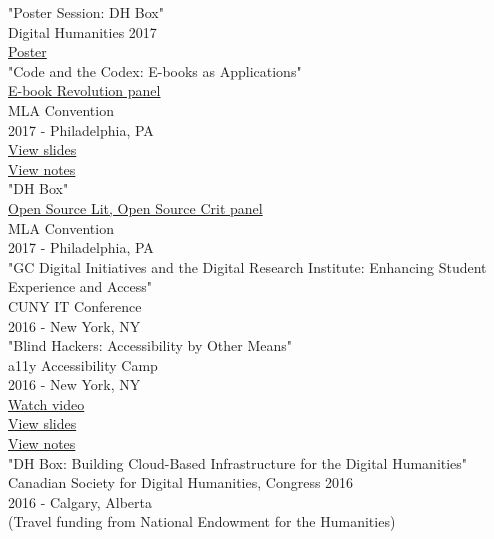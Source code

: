 \documentclass[11pt]{article}
\begin{document}
"Poster Session: DH Box"\\
Digital Humanities 2017\\
\href{./resources/dh_box_poster.jpg}{Poster}\\

"Code and the Codex: E-books as Applications"\\
\href{https://apps.mla.org/program_details?prog_id=75&year=2017}{E-book Revolution panel}\\
MLA Convention\\
2017 - Philadelphia, PA\\
\href{http://htmlpreview.github.io/?https://github.com/smythp/ebooks-as-applications/blob/master/presentation.html#/sec-title-slide}{View slides}\\
\href{https://github.com/smythp/ebooks-as-applications#ebooks-as-applications}{View notes}\\

"DH Box"\\
\href{https://text.mla.hcommons.org/}{Open Source Lit, Open Source Crit panel}\\
MLA Convention\\
2017 - Philadelphia, PA\\

"GC Digital Initiatives and the Digital Research Institute: Enhancing Student Experience and Access"\\
CUNY IT Conference\\
2016 - New York, NY\\

"Blind Hackers: Accessibility by Other Means"\\
a11y Accessibility Camp\\
2016 - New York, NY\\
\href{https://www.youtube.com/watch?v=W8_O3joo4aU}{Watch video}\\
\href{http://htmlpreview.github.io/?https://github.com/smythp/blind-hackers/blob/master/presentation/foo.html}{View slides}\\
\href{https://github.com/smythp/blind-hackers}{View notes}\\

"DH Box: Building Cloud-Based Infrastructure for the Digital Humanities"\\
Canadian Society for Digital Humanities, Congress 2016\\
2016 - Calgary, Alberta\\
(Travel funding from National Endowment for the Humanities)\\
\end{document}
